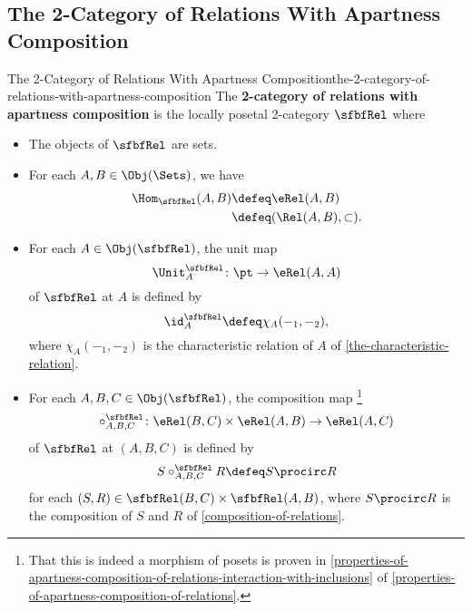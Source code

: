 \subsection{The 2-Category of Relations With Apartness Composition}\label{subsection-the-2-category-of-relations-with-apartness-composition}
\begin{definition}{The 2-Category of Relations With Apartness Composition}{the-2-category-of-relations-with-apartness-composition}%
    The \textbf{2-category of relations with apartness composition} is the locally posetal 2-category $\sfbfRel$ where
    \begin{itemize}
        \item{}The objects of $\sfbfRel$ are sets.
        \item{}For each $A,B\in\Obj(\Sets)$, we have
            \begin{align*}
                \Hom_{\sfbfRel}(A,B) &\defeq \eRel(A,B)\\%
                                     &\defeq (\Rel(A,B),\subset).%
            \end{align*}
        \item{}For each $A\in\Obj(\sfbfRel)$, the unit map
            \[
                \Unit^{\sfbfRel}_{A}
                \colon
                \pt
                \to
                \eRel(A,A)
            \]%
            of $\sfbfRel$ at $A$ is defined by
            \[
                \id^{\sfbfRel}_{A}
                \defeq
                \chi_{A}(-_{1},-_{2}),
            \]%
            where $\chi_{A}(-_{1},-_{2})$ is the characteristic relation of $A$ of \cref{the-characteristic-relation}.
        \item{}For each $A,B,C\in\Obj(\sfbfRel)$, the composition map%
            \footnote{%
                That this is indeed a morphism of posets is proven in \cref{properties-of-apartness-composition-of-relations-interaction-with-inclusions} of \cref{properties-of-apartness-composition-of-relations}.
                \par\vspace*{\TCBBoxCorrection}
            }%
            \[
                \circ^{\sfbfRel}_{A,B,C}%
                \colon%
                \eRel(B,C)%
                \times%
                \eRel(A,B)%
                \to%
                \eRel(A,C)%
            \]%
            of $\sfbfRel$ at $(A,B,C)$ is defined by%
            \[
                S\mathbin{{\circ}^{\sfbfRel}_{A,B,C}}R
                \defeq
                S\procirc R
            \]%
            for each $(S,R)\in\sfbfRel(B,C)\times\sfbfRel(A,B)$, where $S\procirc R$ is the composition of $S$ and $R$ of \cref{composition-of-relations}.
    \end{itemize}
\end{definition}
